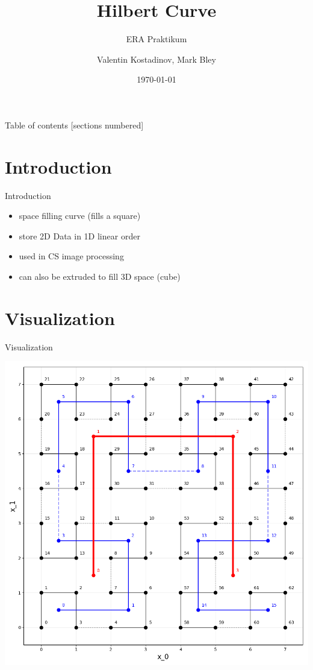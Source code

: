 \documentclass[12pt]{beamer}
\title{Hilbert Curve}
\subtitle{ERA Praktikum}
\date{\today}
\author{Valentin Kostadinov, Mark Bley}
\institute{Technical University of Munich}
\begin{document}
\maketitle

\begin{frame}{Table of contents}
  [sections numbered]
  \tableofcontents[hideallsubsections]
\end{frame}

\section{Introduction}

\begin{frame}[fragile]{Introduction}
    \begin{itemize}
        \item space filling curve (fills a square)
        \item store 2D Data in 1D linear order
        \item used in CS image processing
        \item can also be extruded to fill 3D space (cube)
    \end{itemize}
\end{frame}

\section{Visualization}


\begin{frame}[fragile]{Visualization}
    \begin{center}
        \includegraphics[width=\textwidth,height=0.8\textheight,keepaspectratio]
        {../img/hilbert-sample.png}
    \end{center}
\end{frame}
\end{document}
